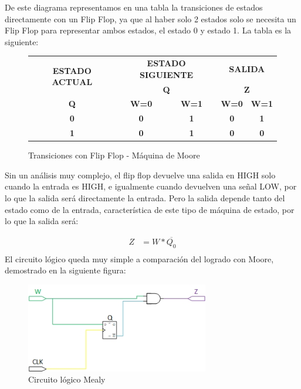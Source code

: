 \documentclass[10pt,a4paper]{article}
\begin{document}
De este diagrama representamos en una tabla la transiciones de estados directamente con un Flip Flop, ya que al haber solo 2 estados solo se necesita un Flip Flop para representar ambos estados, el estado 0 y estado 1. La tabla es la siguiente:

\begin{figure}[H]
	\begin{center}
		\begin{tabular}{|c|c|c|c|c|}
\hline
\multirow{2}{*}{\textbf{ESTADO ACTUAL}} & \multicolumn{2}{c|}{\textbf{ESTADO SIGUIENTE}} & \multicolumn{2}{c|}{\textbf{SALIDA}} \\ \cline{2-5} 
 & \multicolumn{2}{c|}{\textbf{Q}} & \multicolumn{2}{c|}{\textbf{Z}} \\ \hline
\textbf{Q} & \textbf{W=0} & \textbf{W=1} & \textbf{W=0} & \textbf{W=1} \\ \hline
\textbf{0} & \textbf{0} & \textbf{1} & \textbf{0} & \textbf{1} \\ \hline
\textbf{1} & \textbf{0} & \textbf{1} & \textbf{0} & \textbf{0} \\ \hline
		\end{tabular}
		\caption{Transiciones con Flip Flop - Máquina de Moore} 
		\label{3_fig8}
	\end{center}
\end{figure}

Sin un análisis muy complejo, el flip flop devuelve una salida en HIGH solo cuando la entrada es HIGH, e igualmente cuando devuelven una señal LOW, por lo que la salida será directamente la entrada. Pero la salida depende tanto del estado como de la entrada, característica de este tipo de máquina de estado, por lo que la salida será:

\begin{align*}
	Z &= W * \overline{Q_{0}} \\
\end{align*}
El circuito lógico queda muy simple a comparación del logrado con Moore, demostrado en la siguiente figura:

\begin{figure}[H]
	\centering
	\includegraphics[width=8cm]{Imagenes/circej3mealy.jpg}
	\caption{Circuito lógico Mealy}
\end{figure}
\end{document}
